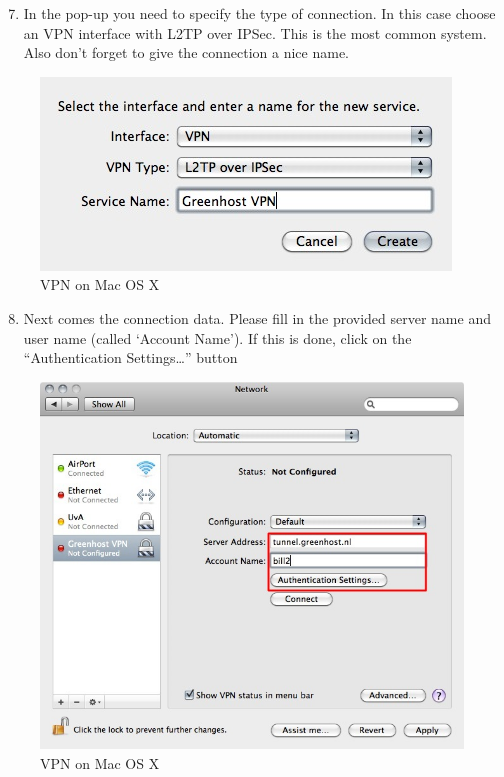 \begin{enumerate}[1.]
\setcounter{enumi}{6}
\item
  In the pop-up you need to specify the type of connection. In this case
  choose an VPN interface with L2TP over IPSec. This is the most common
  system. Also don't forget to give the connection a nice name.
\end{enumerate}
\begin{figure}[htbp]
\centering
\includegraphics{vpn_osx_07.jpg}
\caption{VPN on Mac OS X}
\end{figure}

\begin{enumerate}[1.]
\setcounter{enumi}{7}
\item
  Next comes the connection data. Please fill in the provided server
  name and user name (called `Account Name'). If this is done, click on
  the ``Authentication Settings\ldots{}'' button
\end{enumerate}
\begin{figure}[htbp]
\centering
\includegraphics{vpn_osx_08.jpg}
\caption{VPN on Mac OS X}
\end{figure}

